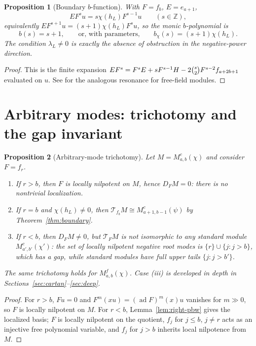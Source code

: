 \documentclass[11pt,a4paper]{article}
\newcommand{\Z}{\mathbb Z}
\newcommand{\ad}{\operatorname{ad}}
\newcommand{\T}{\mathcal T}
\theoremstyle{plainupright}
\newtheorem{proposition}{Proposition}[section]
\begin{document}
\begin{proposition}[Boundary \(b\)-function]\label{prop:bfun}
With \(F=f_b\), \(E=e_{a+1}\),
\[
EF^su=s\chi(h_L)F^{s-1}u\qquad(s\in\Z),
\]
equivalently \(EF^{s+1}u=(s+1)\chi(h_L)F^su\), so the monic \(b\)-polynomial is
\[
b(s)=s+1,\qquad\text{or, with parameters,}\qquad
b_\chi(s)=(s+1)\chi(h_L).
\]
The condition \(\lambda_L\ne0\) is exactly the absence of obstruction in the
negative-power direction.
\end{proposition}

\begin{proof}
This is the finite expansion
\(EF^s=F^sE+sF^{s-1}H-2\tbinom{s}{2}F^{s-2}f_{a+2b+1}\) evaluated on \(u\).
See \cite[Section 5]{FGM} for the analogous resonance for free-field modules.
\end{proof}

\section{Arbitrary modes: trichotomy and the gap invariant}\label{sec:trichotomy}

\begin{proposition}[Arbitrary-mode trichotomy]\label{prop:trichotomy}
Let \(M=M^c_{a,b}(\chi)\) and consider \(F=f_r\).
\begin{enumerate}[label=\textup{(\roman*)},leftmargin=2.8em]
\item If \(r>b\), then \(F\) is locally nilpotent on \(M\), hence
\(D_FM=0\): there is no nontrivial localization.
\item If \(r=b\) and \(\chi(h_L)\ne0\), then
\(\T_{f_b}M\cong M^c_{a+1,b-1}(\psi)\) by Theorem~\ref{thm:boundary}.
\item If \(r<b\), then \(D_FM\ne0\), but \(\T_FM\) is not isomorphic to any
standard module \(M^c_{a',b'}(\chi')\): the set of locally nilpotent negative
root modes is \(\{r\}\cup\{j:j>b\}\), which has a gap, while standard modules
have full upper tails \(\{j:j>b'\}\).
\end{enumerate}
The same trichotomy holds for \(M^f_{a,b}(\chi)\). Case (iii) is developed in
depth in Sections~\ref{sec:cartan}--\ref{sec:deep}.
\end{proposition}

\begin{proof}
For \(r>b\), \(Fu=0\) and \(F^m(xu)=(\ad F)^m(x)u\) vanishes for \(m\gg0\),
so \(F\) is locally nilpotent on \(M\). For \(r<b\), Lemma~\ref{lem:right-pbw}
gives the localized basis; \(F\) is locally nilpotent on the quotient, \(f_j\)
for \(j\le b\), \(j\ne r\) acts as an injective free polynomial variable, and
\(f_j\) for \(j>b\) inherits local nilpotence from \(M\).
\end{proof}
\end{document}
